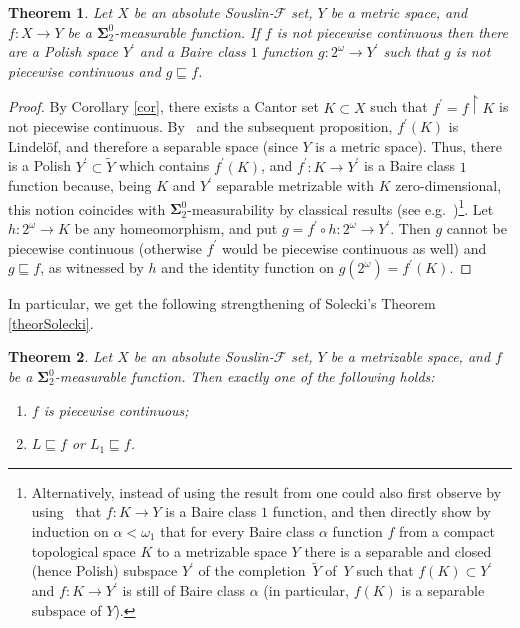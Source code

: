 \documentclass{raex}
\theoremstyle{plain}
\newtheorem{thm}{Theorem}
\theoremstyle{definition}
\theoremstyle{remark}
\def\S{\mathbf{\Sigma}}
\def\F{\mathcal{F}}
\renewcommand{\theenumi}{\arabic{enumi}}
\renewcommand{\labelenumi}{(\theenumi)}
\begin{document}
\begin{thm}\label{theorreduction}
Let $X$ be an absolute Souslin-$\F$ set, $Y$ be a metric space, and $f \colon X \to Y$ be a $\S^0_2$-measurable function. If $f$ is not piecewise continuous then there are a Polish space $Y^\prime$ and a Baire class $1$ function $g \colon 2^\omega \to Y^\prime$ such that $g$ is not piecewise continuous and $g \sqsubseteq f$.
\end{thm}

\begin{proof}
By Corollary \ref{cor}, there exists a Cantor set $K \subset X$ such that 
$f^\prime =  f \restriction K$ is not piecewise continuous. 
By~\cite[Theorem~1]{frolik} and the 
subsequent proposition, $f^\prime(K)$ is Lindel\"of, and therefore a separable 
space (since $Y$ is a 
metric space). Thus, there is a Polish $Y^\prime \subset \widetilde{Y}$ which 
contains $f^\prime(K)$, and $f^\prime \colon K \to Y^\prime$ is 
a Baire class $1$ function because, being $K$ and $Y^\prime$ separable metrizable with $K$ zero-dimensional, 
this notion coincides with $\S^0_2$-measurability by classical results (see e.g.~\cite[Theorem 24.10]{kechris})\footnote{Alternatively, instead of using the result from \cite{frolik} one 
could also first observe by using~\cite[Theorem 8]{hansell} that $f \colon K \to Y$ is a Baire class $1$ function, and then directly show by induction on \( \alpha < \omega_1 \) that for every 
Baire class $\alpha$  function $f$  from a compact topological space $K$ to a 
metrizable space $Y$ there is a separable and closed (hence Polish) subspace 
$Y^\prime$ of the completion~$\widetilde{Y}$ of~$Y$ such that 
$f(K) \subset Y^\prime$ and $f \colon K \to Y^\prime$ is still of Baire class 
$\alpha$ (in particular, $f(K)$ is a separable subspace of $Y$).}. Let $h \colon 2^\omega \to K$ be any homeomorphism, and put 
$g = f^\prime \circ h \colon 2^\omega \to Y^\prime$. Then $g$ cannot be 
piecewise continuous (otherwise $f^\prime$ would be piecewise continuous as 
well) and $g \sqsubseteq f$, as witnessed by $h$ and the identity function on 
$g(2^\omega) = f^\prime(K)$.
\end{proof}


In particular, we get the following strengthening of Solecki's Theorem \ref{theorSolecki}.


\begin{thm}\label{theorSoleckigen}
Let $X$ be an absolute Souslin-$\F$ set, $Y$ be a metrizable space, and $f$ be a $\S^0_2$-measurable function. Then exactly one of the following holds:
{
\renewcommand{\labelenumi}{\textnormal{(\roman{enumi})}}
\begin{enumerate}
\item
$f$ is piecewise continuous;
\item
$L \sqsubseteq f$ or $L_1 \sqsubseteq f$.
\end{enumerate}
}
\end{thm}
\end{document}
